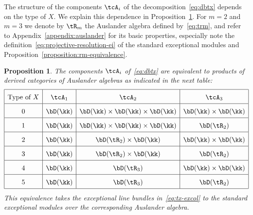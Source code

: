 \documentclass[11pt]{amsart}
\theoremstyle{plain}
\newtheorem{proposition}[theorem]{Proposition}
\theoremstyle{definition}
\theoremstyle{remark}
\begin{document}
The structure of the components $\tcA_i$ of the decomposition~\eqref{eq:dbtx} depends on the type of $X$.
We explain this dependence in Proposition~\ref{proposition:tcai-auslander}.
For $m = 2$ and $m = 3$ we denote by $\tR_m$ the Auslander algebra defined by~\eqref{eq:trm}, and refer to Appendix~\ref{appendix:auslander} for its basic properties, 
especially note the definition~\eqref{eq:projective-resolution-ei} of the {\sf standard exceptional modules} and Proposition~\ref{proposition:rm-equivalence}.



\begin{proposition}
\label{proposition:tcai-auslander}
The components $\tcA_i$ of~\eqref{eq:dbtx} are equivalent to products of derived categories of Auslander algebras as indicated in the next table:
\begin{equation*}\def\arraystretch{1.7}%
\begin{array}{|c|c|c|c|}
\hline
\text{Type of $X$} & \tcA_1 & \tcA_2 & \tcA_3 \\
\hline 
0 & \bD(\kk) & \bD(\kk) \times \bD(\kk) \times \bD(\kk) & \bD(\kk) \times \bD(\kk) \\
\hline
1 & \bD(\kk) & \bD(\kk) \times \bD(\kk) \times \bD(\kk) & \bD(\tR_2) \\
\hline
2 & \bD(\kk) & \bD(\tR_2) \times \bD(\kk) & \bD(\kk)  \times \bD(\kk) \\
\hline
3 & \bD(\kk) & \bD(\tR_2) \times \bD(\kk) & \bD(\tR_2) \\
\hline
4 & \bD(\kk) & \bD(\tR_3) & \bD(\kk)  \times \bD(\kk) \\
\hline
5 & \bD(\kk) & \bD(\tR_3) & \bD(\tR_2) \\
\hline
\end{array}
\end{equation*}
This equivalence takes the exceptional line bundles in~\eqref{eq:tx-excol} 
to the standard exceptional modules over the corresponding Auslander algebra.
\end{proposition}
\end{document}
